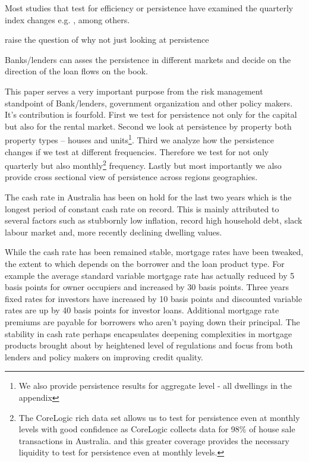 \documentclass[AEJ,reqno, draftmode]{AEA}
\begin{document}
Most studies that test for efficiency or persistence have examined the quarterly index changes e.g. \citep{Case1989125, hosios1991measuring, clayton1996rational}, among others.






raise the question of why not just looking at persistence 






Banks/lenders can asses the persistence in different markets and decide on the direction of the loan flows on the book.

This paper serves a very important purpose from the risk management standpoint of Bank/lenders, government organization and other policy makers. It's contribution is fourfold. First we test for persistence not only for the capital but also for the rental market. Second we look at persistence by property both property types -- houses and units\footnote{We also provide persistence results for aggregate level - all dwellings in the appendix}. Third we analyze how the persistence changes if we test at different frequencies. Therefore we test for not only quarterly but also monthly\footnote{The CoreLogic rich data set allows us to test for persistence even at monthly levels with good confidence as CoreLogic collects data for 98\% of house sale transactions in Australia. and this greater coverage provides the necessary liquidity to test for persistence even at monthly levels.} frequency. Lastly but most importantly we also provide cross sectional view of persistence across regions geographies.

The cash rate in Australia has been on hold for the last two years which is the longest period of constant cash rate on record. This is mainly attributed to several factors such as stubbornly low inflation, record high household debt, slack labour market and, more recently declining dwelling values.

While the cash rate has been remained stable, mortgage rates have been tweaked, the extent to which depends on the borrower and the loan product type. For example the average standard variable mortgage rate has actually reduced by 5 basis points for owner occupiers and increased by 30 basis points. Three years fixed rates for investors have increased by 10 basis points and discounted variable rates are up by 40 basis points for investor loans. Additional mortgage rate premiums are payable for borrowers who aren't paying down their principal. The stability in cash rate perhaps encapsulates deepening complexities in mortgage products brought about by heightened level of regulations and focus from both lenders and policy makers on improving credit quality. 
\end{document}
